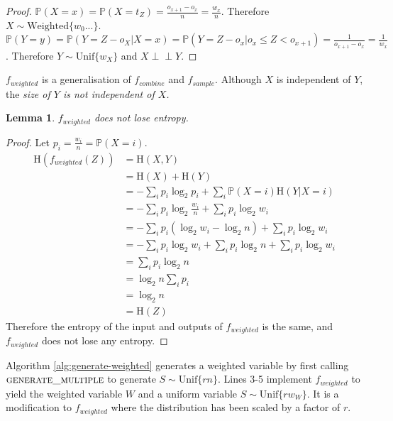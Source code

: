\documentclass[lettersize,onecolumn]{IEEEtran}
\newtheorem{lemma}{Lemma}
\newcommand{\indep}{\perp\!\!\!\perp}
\newcommand{\unif}[1]{\mathrm{Unif}\{#1\}}
\newcommand{\entropy}[1]{\mathrm{H}(#1)}
\newcommand{\prob}[1]{\mathbb{P}(#1)}
\begin{document}
\begin{proof}
    $\prob{X=x} = \prob{X = t_Z} = \frac{o_{x+1} - o_x}{n} = \frac{w_x}{n}$. Therefore $X \sim \mathrm{Weighted}\{w_0 ...\}$.  $\prob{Y=y} = \prob{Y = Z - o_X | X = x} = \prob{Y = Z - o_x | o_{x} \le Z < o_{x+1}} = \frac{1}{o_{x+1}-o_x} = \frac{1}{w_x}$. Therefore $Y \sim \unif{w_X}$ and $X \indep Y$.
\end{proof}

$f_{weighted}$ is a generalisation of $f_{combine}$ and $f_{sample}$. Although $X$ is independent of $Y$, the \em size \em of $Y$ is not independent of $X$.

\begin{lemma}
    \label{lem:distribution-conservation}
    $f_{weighted}$ does not lose entropy.
\end{lemma}

\begin{proof}
    Let $p_i = \frac{w_i}{n} = \prob{X=i}$.
    \begin{align}
    \entropy{f_{weighted}(Z)}
               &= \entropy{X,Y} \\
               &=  \entropy{X} + \entropy{Y} \\
               & = - \sum_i p_i \log_2p_i + \sum_i \prob{X=i}\entropy{Y|X=i} \\
               & = - \sum_i p_i \log_2 \frac{w_i}{n} + \sum_i p_i\log_2 w_i \\
               & = - \sum_i p_i(\log_2 w_i - \log_2 n) + \sum_i p_i\log_2 w_i \\
               & = - \sum_i p_i\log_2 w_i + \sum_i p_i \log_2 n + \sum_i p_i\log_2 w_i \\
               & = \sum_i p_i \log_2 n \\
               & = \log_2 n \sum_i p_i \\
               & = \log_2 n \\
               & = \entropy{Z}
    \end{align}
    Therefore the entropy of the input and outputs of $f_{weighted}$ is the same, and $f_{weighted}$ does not lose any entropy.
\end{proof}

Algorithm \ref{alg:generate-weighted} generates a weighted variable by first calling $\textsc{generate\_multiple}$ to generate $S \sim \unif{rn}$. Lines 3-5 implement $f_{weighted}$ to yield the weighted variable $W$ and a uniform variable $S \sim \unif{rw_W}$. It is a modification to $f_{weighted}$ where the distribution has been scaled by a factor of $r$.
\end{document}
